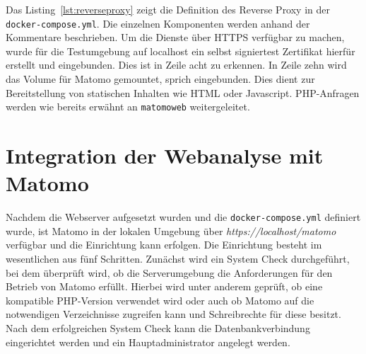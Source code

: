 Das Listing~\ref{lst:reverseproxy} zeigt die Definition des Reverse Proxy in der \texttt{docker-compose.yml}. Die einzelnen Komponenten werden anhand der Kommentare beschrieben. Um die Dienste über HTTPS verfügbar zu machen, wurde für die Testumgebung auf localhost ein selbst signiertest Zertifikat hierfür erstellt und eingebunden. Dies ist in Zeile acht zu erkennen. In Zeile zehn wird das Volume für Matomo gemountet, sprich eingebunden. Dies dient zur Bereitstellung von statischen Inhalten wie HTML oder Javascript. PHP-Anfragen werden wie bereits erwähnt an \texttt{matomo\textunderscore web} weitergeleitet.

\section{Integration der Webanalyse mit Matomo}
Nachdem die Webserver aufgesetzt wurden und die \texttt{docker-compose.yml} definiert wurde, ist Matomo in der lokalen Umgebung über \textit{https://localhost/matomo} verfügbar und die Einrichtung kann erfolgen. Die Einrichtung besteht im wesentlichen aus fünf Schritten. Zunächst wird ein System Check durchgeführt, bei dem überprüft wird, ob die Serverumgebung die Anforderungen für den Betrieb von Matomo erfüllt. Hierbei wird unter anderem geprüft, ob eine kompatible PHP-Version verwendet wird oder auch ob Matomo auf die notwendigen Verzeichnisse zugreifen kann und Schreibrechte für diese besitzt. Nach dem erfolgreichen System Check kann die Datenbankverbindung eingerichtet werden und ein Hauptadministrator angelegt werden. 

